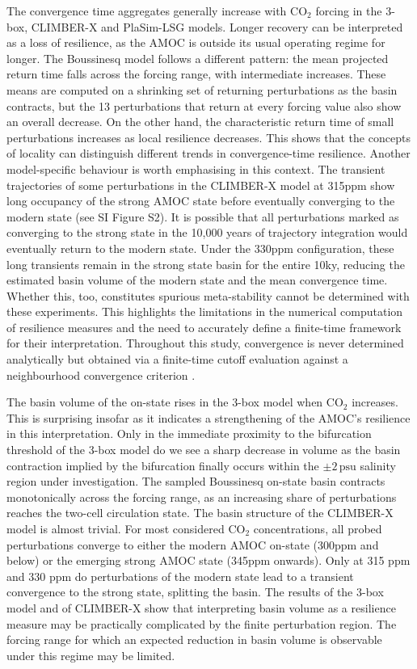 \documentclass[12pt, a4paper]{article}
\newcommand{\psu}{\,\text{psu}}
\newcommand{\CO}{CO\ensuremath{_2}}
\begin{document}
The convergence time aggregates generally increase with \CO{} forcing in the 3-box, CLIMBER-X and PlaSim-LSG models. Longer recovery can be interpreted as a loss of resilience, as the AMOC is outside its usual operating regime for longer. The Boussinesq model follows a different pattern: the mean projected return time falls across the forcing range, with intermediate increases. These means are computed on a shrinking set of returning perturbations as the basin contracts, but the 13 perturbations that return at every forcing value also show an overall decrease. On the other hand, the characteristic return time of small perturbations increases as local resilience decreases. This shows that the concepts of locality can distinguish different trends in convergence-time resilience. Another model-specific behaviour is worth emphasising in this context. The transient trajectories of some perturbations in the CLIMBER-X model at 315ppm show long occupancy of the strong AMOC state before eventually converging to the modern state (see SI Figure S2). It is possible that all perturbations marked as converging to the strong state in the 10,000 years of trajectory integration would eventually return to the modern state. Under the 330ppm configuration, these long transients remain in the strong state basin for the entire 10ky, reducing the estimated basin volume of the modern state and the mean convergence time. Whether this, too, constitutes spurious meta-stability cannot be determined with these experiments. This highlights the limitations in the numerical computation of resilience measures and the need to accurately define a finite-time framework for their interpretation. Throughout this study, convergence is never determined analytically but obtained via a finite-time cutoff evaluation against a neighbourhood convergence criterion \citep{Morr2026ComputingResilienceMeasures}.

The basin volume of the on-state rises in the 3-box model when \CO{} increases. This is surprising insofar as it indicates a strengthening of the AMOC's resilience in this interpretation. Only in the immediate proximity to the bifurcation threshold of the 3-box model do we see a sharp decrease in volume as the basin contraction implied by the bifurcation finally occurs within the $\pm2\psu{}$ salinity region under investigation. The sampled Boussinesq on-state basin contracts monotonically across the forcing range, as an increasing share of perturbations reaches the two-cell circulation state. The basin structure of the CLIMBER-X model is almost trivial. For most considered \CO{} concentrations, all probed perturbations converge to either the modern AMOC on-state (300ppm and below) or the emerging strong AMOC state (345ppm onwards). Only at 315 ppm and 330 ppm do perturbations of the modern state lead to a transient convergence to the strong state, splitting the basin. The results of the 3-box model and of CLIMBER-X show that interpreting basin volume as a resilience measure may be practically complicated by the finite perturbation region. The forcing range for which an expected reduction in basin volume is observable under this regime may be limited.
\end{document}
